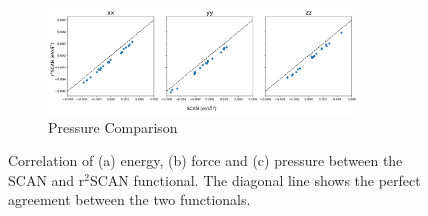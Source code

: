 \begin{figure}[tbhp]
\begin{subfigure}{0.9\textwidth}
    \includegraphics[width=0.9\textwidth]{images/scan_vs_r2scan/pressure_compare.png}
    \caption{Pressure Comparison}
    \label{fig:scan_r2scan_P}
  \end{subfigure}
  \caption{Correlation of  (a) energy, (b) force and (c) pressure between the
    SCAN and
    r$^2$SCAN functional. The diagonal line shows the perfect agreement between
    the two functionals.}
  \label{fig:scan_r2scan}
\end{figure}

